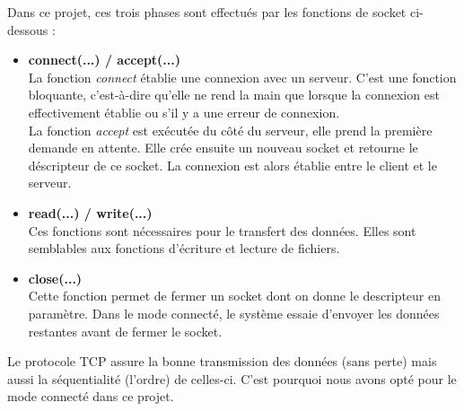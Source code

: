     Dans ce projet, ces trois phases sont effectués par les fonctions de socket ci-dessous :
    \begin{itemize}
        \item \textbf{connect(...) / accept(...)} \\
        La fonction \textit{connect} établie une connexion avec un serveur. C'est une fonction bloquante, c'est-à-dire qu'elle ne rend la main que lorsque la connexion est effectivement établie ou s'il y a une erreur de connexion.\\
        La fonction \textit{accept} est exécutée du côté du serveur, elle prend la première demande en attente. Elle crée ensuite un nouveau socket et retourne le déscripteur de ce socket. La connexion est alors établie entre le client et le serveur.
        \item \textbf{read(...) / write(...)}\\
        Ces fonctions sont nécessaires pour le transfert des données. Elles sont semblables aux fonctions d'écriture et lecture de fichiers.
        
        \item \textbf{close(...)}\\
        Cette fonction permet de fermer un socket dont on donne le descripteur en paramètre. Dans le mode connecté, le système essaie d'envoyer les données restantes avant de fermer le socket.
    \end{itemize}
        
    Le protocole TCP assure la bonne transmission des données (sans perte) mais aussi la séquentialité (l'ordre) de celles-ci. C'est pourquoi nous avons opté pour le mode connecté dans ce projet.
